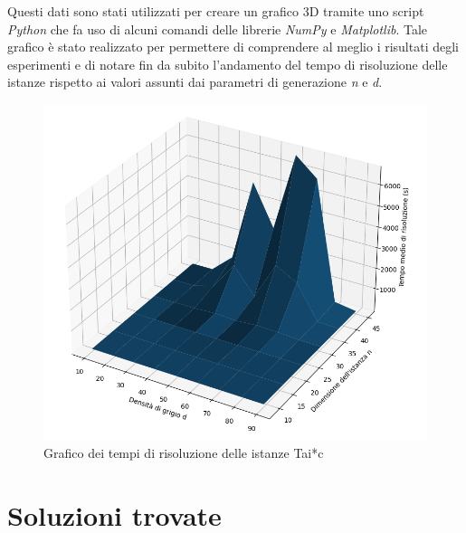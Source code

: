 \newpage \noindent
Questi dati sono stati utilizzati per creare un grafico 3D tramite uno script \textit{Python} che fa uso di alcuni comandi delle 
librerie \textit{NumPy} e \textit{Matplotlib}. Tale grafico è stato realizzato per permettere di comprendere al meglio i risultati 
degli esperimenti e di notare fin da subito l'andamento del tempo di risoluzione delle istanze rispetto ai valori assunti dai 
parametri di generazione \textit{n} e \textit{d}.
\begin{figure}[h!]
    \centering
    \includegraphics[scale=0.4]{images/resolution_times.png}
    \caption{Grafico dei tempi di risoluzione delle istanze Tai*c}
    \label{fig:times}
\end{figure}

\newpage
\section{Soluzioni trovate}